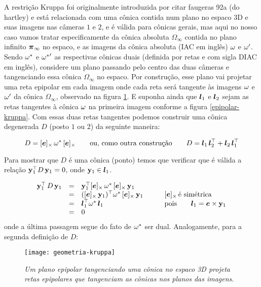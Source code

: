 A restrição Kruppa foi originalmente introduzida por citar faugeras 92a (do hartley) e está relacionada com uma cônica contida num plano no espaco 3D e suas imagens nas câmeras $1$ e $2$, e é válida para cônicas gerais, mas aqui no nosso caso vamos tratar especificamente da cônica absoluta $\Omega_\infty$ contida no plano infinito $\boldsymbol{\pi}_\infty$ no espaco, e as imagens da cônica absoluta (IAC em inglês) ${\bf \omega}$ e ${\bf \omega'}$. Sendo ${\bf \omega}^*$ e ${{\bf \omega}^*}'$ as respectivas cônicas duais (definida por retas e com sigla DIAC em inglês), considere um plano passando pelo centro das duas câmeras e tangenciando essa cônica $\Omega_\infty$ no espaco. Por construção, esse plano vai projetar uma reta epipolar em cada imagem onde cada reta será tangente às imagens ${\bf \omega}$ e ${\bf \omega'}$ da cônica $\Omega_\infty$, observado na figura \ref{geometria-kruppa}. E suponha ainda que $\boldsymbol{l}_1$ e $\boldsymbol{l}_2$ sejam as retas tangentes à cônica ${\bf \omega}$ na primeira imagem conforme a figura \ref{epipolar-kruppa}. Com essas duas retas tangentes podemos construir uma cônica degenerada $D$ (posto $1$ ou $2$) da seguinte maneira:  

\begin{equation}\label{eq.def.con.deg}
D=[\boldsymbol{e}]_\times\,{\bf \omega}^*\,[\boldsymbol{e}]_\times \qquad \text{ou, como outra construção} \qquad D=\boldsymbol{l}_1\,\boldsymbol{l}_2^\top + \boldsymbol{l}_2\,\boldsymbol{l}_1^\top
\end{equation}

Para mostrar que $D$ é uma cônica (ponto) temos que verificar que é válida a relação ${\bf y}_1^\top D\,{\bf y}_1=0$, onde ${\bf y}_1\in\boldsymbol{l}_1$.

\begin{equation*}
\begin{array}{rcll}
{\bf y}_1^\top\,D\,{\bf y}_1&=&{\bf y}_1^\top [\boldsymbol{e}]_\times\,{\bf \omega}^*\,[\boldsymbol{e}]_\times\,{\bf y}_1&\\
&=&([\boldsymbol{e}]_\times\,{\bf y}_1)^\top {\bf \omega}^*\,[\boldsymbol{e}]_\times\,{\bf y}_1& \qquad [\boldsymbol{e}]_\times\,\text{é simétrica}\\
&=&\boldsymbol{l}_1^\top {\bf \omega}^*\,\boldsymbol{l}_1& \qquad\text{pois}\qquad\boldsymbol{l}_1=\boldsymbol{e}\times{\bf y}_1\\
&=&0&
\end{array}
\end{equation*}
onde a última passagem segue do fato de ${\bf \omega}^*$ ser dual. Analogamente, para a segunda definição de $D$:

\begin{figure}[!htb]
\centering
\texttt{[image: geometria-kruppa]}
\caption{\textit{Um plano epipolar tangenciando uma cônica no espaco 3D projeta retas epipolares que tangenciam as cônicas nos planos das imagens}.}
\label{geometria-kruppa}
\end{figure}

